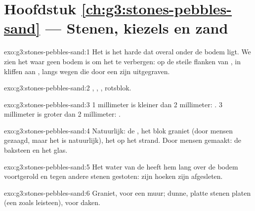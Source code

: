 \section*{Hoofdstuk \ref{ch:g3:stones-pebbles-sand} --- Stenen, kiezels en zand}

\begin{solution}{exo:g3:stones-pebbles-sand:1}
Het  is het harde  dat overal onder de bodem ligt.
We zien het waar geen bodem is om het te verbergen: op de steile flanken
van , in kliffen aan , langs wegen die door een  zijn
uitgegraven.
\end{solution}

\begin{solution}{exo:g3:stones-pebbles-sand:2}
, , , rotsblok.
\end{solution}

\begin{solution}{exo:g3:stones-pebbles-sand:3}
1 millimeter is kleiner dan 2 millimeter: . 3 millimeter is groter
dan 2 millimeter: .
\end{solution}

\begin{solution}{exo:g3:stones-pebbles-sand:4}
Natuurlijk: de , het blok graniet (door mensen gezaagd, maar het
 is natuurlijk), het  op het strand. Door mensen gemaakt: de
baksteen en het glas.
\end{solution}

\begin{solution}{exo:g3:stones-pebbles-sand:5}
Het water van de  heeft hem lang over de bodem voortgerold en tegen
andere stenen gestoten: zijn hoeken zijn afgesleten.
\end{solution}

\begin{solution}{exo:g3:stones-pebbles-sand:6}
Graniet, voor een muur; dunne, platte stenen platen (een  zoals leisteen), voor daken.
\end{solution}

